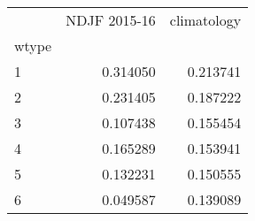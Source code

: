 \begin{tabular}{lrr}
\toprule
{} &  NDJF 2015-16 &  climatology \\
wtype &               &              \\
\midrule
1     &      0.314050 &     0.213741 \\
2     &      0.231405 &     0.187222 \\
3     &      0.107438 &     0.155454 \\
4     &      0.165289 &     0.153941 \\
5     &      0.132231 &     0.150555 \\
6     &      0.049587 &     0.139089 \\
\bottomrule
\end{tabular}
